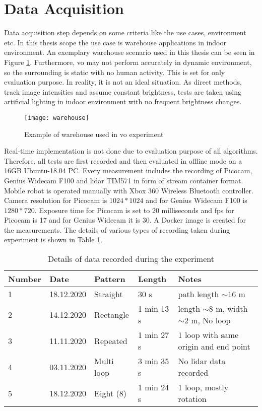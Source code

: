 \section{Data Acquisition}
Data acquisition step depends on some criteria like the use cases, environment etc. In this thesis scope the use case is warehouse applications in indoor environment. An exemplary warehouse scenario used in this thesis can be seen in Figure \ref{fig:warehouse}. Furthermore, \acrshort{vo} may not perform accurately in dynamic environment, so the surrounding is static with no human activity. This is set for only evaluation purpose. In reality, it is not an ideal situation. As direct methods, track image intensities and assume constant brightness, tests are taken using artificial lighting in indoor environment with no frequent brightness changes.\\
\begin{figure}[H]
	\centering
	\texttt{[image: warehouse]}
	\caption{Example of warehouse used in \acrshort{vo} experiment}
	\label{fig:warehouse}
\end{figure}
\noindent Real-time implementation is not done due to evaluation purpose of all algorithms. Therefore, all tests are first recorded and then evaluated in offline mode on a 16GB Ubuntu-18.04 PC. Every measurement includes the recording of Picocam, Genius Widecam F100 and \acrshort{lidar} TIM571 in form of stream container format. Mobile robot is operated manually with Xbox 360 Wireless Bluetooth controller. Camera resolution for Picocam is $ 1024 * 1024 $ and for Genius Widecam F100 is $ 1280 * 720 $. Exposure time for Picocam is set to 20 milliseconds and \acrshort{fps} for Picocam is 17 and for Genius Widecam it is 30. A Docker image is created for the measurements. The details of various types of recording taken during experiment is shown in Table \ref{table:recording}.
\begin{table}[H]
	\centering
	\renewcommand{\arraystretch}{1.5}
	\begin{tabular}{ l l  l  l  p{5cm} }
		
		\textbf{Number} & \textbf{Date} & \textbf{Pattern}  & \textbf{Length}  & \textbf{Notes}  \\    
		\hline
		1 & 18.12.2020 &  Straight  & 30 s & path length $\sim$16 m  \\ 
		\hline
		2 & 14.12.2020  & Rectangle & 1 min 13 s   & length $\sim$8 m, width $\sim$2 m, No loop\\ 
		\hline
		3 & 11.11.2020  & Repeated  & 1 min 27 s  & 1 loop with same origin and end point\\ 
		\hline
		4 & 03.11.2020   & Multi loop  &  3 min 35 s  & No \acrshort{lidar} data recorded \\
		\hline
		5 & 18.12.2020 & Eight (8) & 1 min 24 s &  1 loop, mostly rotation  \\
		\hline
	\end{tabular}
	\caption{Details of data recorded during the experiment}
	\label{table:recording}
\end{table}

